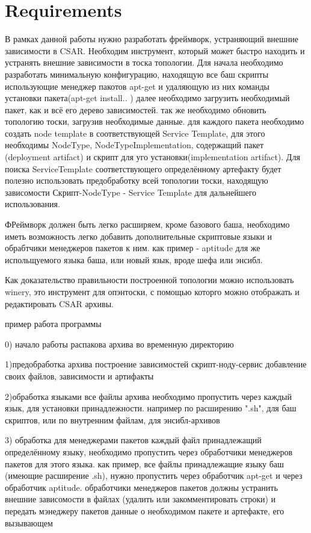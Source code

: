 
\chapter{Requirements}
\label{chap:req}


В рамках данной работы нужно разработать фреймворк, устраняющий внешние зависимости в CSAR. 
Необходим инструмент, который может быстро находить и устранять внешние зависимости в тоска топологии. 
Для начала необходимо разработать минимальную конфигурацию, находящую все баш скрипты использующие менеджер пакотов apt-get и удаляющую из них команды установки пакета(apt-get install.. )
далее необходимо загрузить необходимый пакет, как и всё его дерево зависимостей. так же необходимо обновить топологию тоски, загрузив необходимые данные. 
для каждого пакета необходимо создать node template в соответствующей Service Template, для этого необходимы NodeType, NodeTypeImplementation, содержащий пакет (deployment artifact) и скрипт для уго установки(implementation artifact). 
Для поиска ServiceTemplate соответствующего определённому артефакту будет полезно использовать предобработку всей топологии тоски, находящую зависомости Скрипт-NodeType - Service Template для дальнейшего использования.

ФРеймворк должен быть легко расширяем, кроме базового баша, необходимо иметь возможность легко добавить дополнительные скриптовые языки и обрабтчики менеджеров пакетов к ним. как пример - aptitude для же испольщуемого языка баша, или новый язык, вроде шефа или энсибл.

Как доказательство правильности построенной топологии можно использовать winery, 
это инструмент для опэнтоски, с помощью которго можно отображать и редактировать CSAR архивы.

пример работа программы

0) начало работы 
распакова архива во временную директорию

1)предобработка архива
построение зависимостей скрипт-ноду-сервис
добавление своих файлов, зависимости и артифакты

2)обработка языками
все файлы архива необходимо пропустить через каждый язык, для установки принадлежности. например по расширению ".sh", для баш скриптов, или по внутренним файлам, для энсибл-архивов 

3) обработка для менеджерами пакетов
каждый файл принадлежащий определённому языку, необходимо пропустить через обработчики менеджеров пакетов для этого языка. 
как пример, все файлы принадлежащие языку баш (имеющие расширение .sh), нужно пропустить через обработчик apt-get и через обработчик aptitude.
обработчики менеджеров пакетов должны устранить внешние зависомости в файлах (удалить или закомментировать строки) и передать мэнеджеру пакетов данные о необходимом пакете и артефакте, его вызывающем

